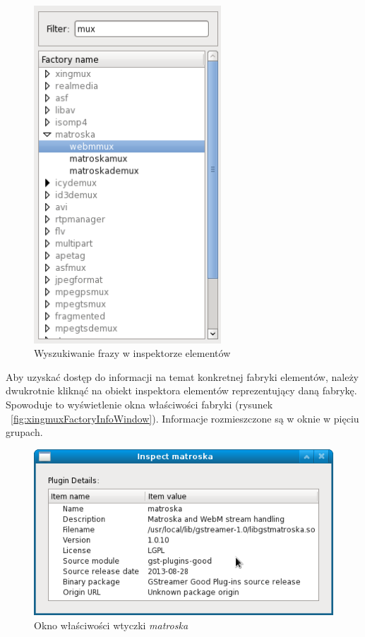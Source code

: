 \documentclass[12pt]{article}
\begin{document}
\begin{figure}[H]
  \includegraphics[width=7cm]{img/element-inspector.png}
  \caption{Wyszukiwanie frazy w inspektorze elementów}
  \label{fig:elementInspector}
\end{figure}
\noindent
Aby uzyskać dostęp do informacji na temat konkretnej fabryki elementów, należy dwukrotnie kliknąć na obiekt inspektora elementów reprezentujący daną fabrykę. Spowoduje to wyświetlenie okna właściwości fabryki (rysunek ~\ref{fig:xingmuxFactoryInfoWindow}). Informacje rozmieszczone są w oknie w pięciu grupach.
\begin{figure}[H]
  \includegraphics[width=12cm]{img/matroska-inspect-window.png}
  \caption{Okno właściwości wtyczki \textit{matroska}}
  \label{fig:matroskaInspectWindow}
\end{figure}
\end{document}
